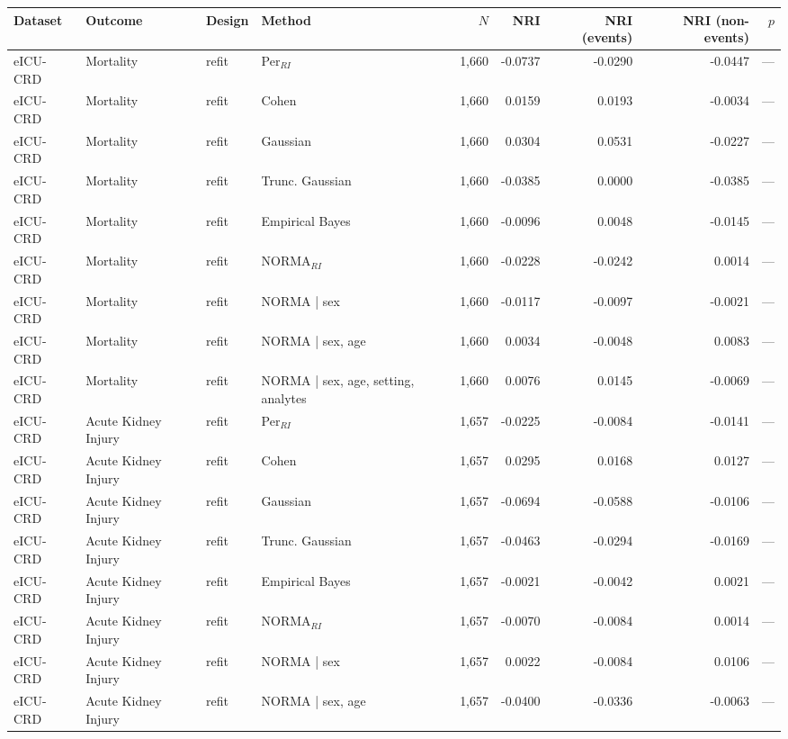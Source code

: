 \begin{table}[ht]
\centering
\footnotesize
\begin{tabular}{ll l l r r r r r}
\toprule
Dataset & Outcome & Design & Method & $N$ & NRI & NRI (events) & NRI (non-events) & $p$ \\
\midrule
eICU-CRD & Mortality & refit & Per$_{RI}$ & 1,660 & -0.0737 & -0.0290 & -0.0447 & --- \\
eICU-CRD & Mortality & refit & Cohen & 1,660 & 0.0159 & 0.0193 & -0.0034 & --- \\
eICU-CRD & Mortality & refit & Gaussian & 1,660 & 0.0304 & 0.0531 & -0.0227 & --- \\
eICU-CRD & Mortality & refit & Trunc. Gaussian & 1,660 & -0.0385 & 0.0000 & -0.0385 & --- \\
eICU-CRD & Mortality & refit & Empirical Bayes & 1,660 & -0.0096 & 0.0048 & -0.0145 & --- \\
eICU-CRD & Mortality & refit & NORMA$_{RI}$ & 1,660 & -0.0228 & -0.0242 & 0.0014 & --- \\
eICU-CRD & Mortality & refit & NORMA | sex & 1,660 & -0.0117 & -0.0097 & -0.0021 & --- \\
eICU-CRD & Mortality & refit & NORMA | sex, age & 1,660 & 0.0034 & -0.0048 & 0.0083 & --- \\
eICU-CRD & Mortality & refit & NORMA | sex, age, setting, analytes & 1,660 & 0.0076 & 0.0145 & -0.0069 & --- \\
eICU-CRD & Acute Kidney Injury & refit & Per$_{RI}$ & 1,657 & -0.0225 & -0.0084 & -0.0141 & --- \\
eICU-CRD & Acute Kidney Injury & refit & Cohen & 1,657 & 0.0295 & 0.0168 & 0.0127 & --- \\
eICU-CRD & Acute Kidney Injury & refit & Gaussian & 1,657 & -0.0694 & -0.0588 & -0.0106 & --- \\
eICU-CRD & Acute Kidney Injury & refit & Trunc. Gaussian & 1,657 & -0.0463 & -0.0294 & -0.0169 & --- \\
eICU-CRD & Acute Kidney Injury & refit & Empirical Bayes & 1,657 & -0.0021 & -0.0042 & 0.0021 & --- \\
eICU-CRD & Acute Kidney Injury & refit & NORMA$_{RI}$ & 1,657 & -0.0070 & -0.0084 & 0.0014 & --- \\
eICU-CRD & Acute Kidney Injury & refit & NORMA | sex & 1,657 & 0.0022 & -0.0084 & 0.0106 & --- \\
eICU-CRD & Acute Kidney Injury & refit & NORMA | sex, age & 1,657 & -0.0400 & -0.0336 & -0.0063 & --- \\

\end{tabular}
\end{table}
